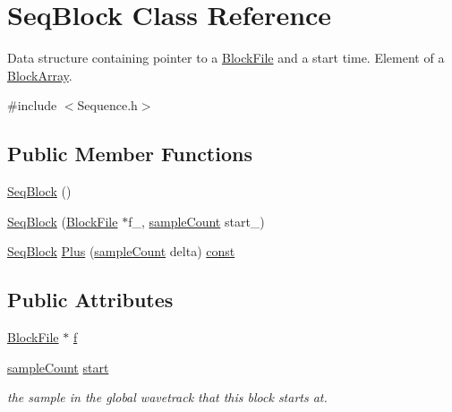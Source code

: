 \hypertarget{class_seq_block}{}\section{Seq\+Block Class Reference}
\label{class_seq_block}


Data structure containing pointer to a \hyperlink{class_block_file}{Block\+File} and a start time. Element of a \hyperlink{class_block_array}{Block\+Array}.  




{\ttfamily \#include $<$Sequence.\+h$>$}

\subsection*{Public Member Functions}
\begin{DoxyCompactItemize}
\item 
\hyperlink{class_seq_block_a7cb77b9c95ece649c049d5eb009abc27}{Seq\+Block} ()
\item 
\hyperlink{class_seq_block_a1b2cb54c97aff03b1e4d73efd9a12ee6}{Seq\+Block} (\hyperlink{class_block_file}{Block\+File} $\ast$f\+\_\+, \hyperlink{include_2audacity_2_types_8h_afa427e1f521ea5ec12d054e8bd4d0f71}{sample\+Count} start\+\_\+)
\item 
\hyperlink{class_seq_block}{Seq\+Block} \hyperlink{class_seq_block_ae97ff01b44774a546719cee543220ccb}{Plus} (\hyperlink{include_2audacity_2_types_8h_afa427e1f521ea5ec12d054e8bd4d0f71}{sample\+Count} delta) \hyperlink{getopt1_8c_a2c212835823e3c54a8ab6d95c652660e}{const} 
\end{DoxyCompactItemize}
\subsection*{Public Attributes}
\begin{DoxyCompactItemize}
\item 
\hyperlink{class_block_file}{Block\+File} $\ast$ \hyperlink{class_seq_block_afc9b7e81170d82463b8849815b2cf2a2}{f}
\item 
\hyperlink{include_2audacity_2_types_8h_afa427e1f521ea5ec12d054e8bd4d0f71}{sample\+Count} \hyperlink{class_seq_block_a38a34e33b7c97b7b2e55163644b9028f}{start}
\begin{DoxyCompactList}\small\item\em the sample in the global wavetrack that this block starts at. \end{DoxyCompactList}\end{DoxyCompactItemize}


